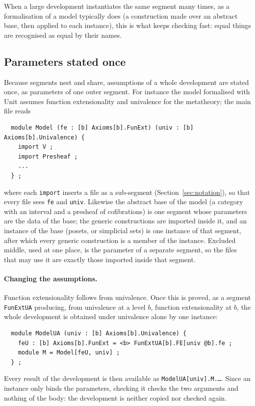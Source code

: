 \documentclass[11pt]{article}
\newcommand{\sys}{\textsf{Unit}\xspace}
\newcommand{\kw}[1]{\texttt{#1}}
\theoremstyle{remark}
\begin{document}
When a large development instantiates
the same segment many times, as a formalisation of a model typically does
(a construction made over an abstract base, then applied to each
instance), this is what keeps checking fast: equal things are recognised
as equal by their names.

\subsection{Parameters stated once}\label{sec:params}

Because segments nest and share, assumptions of a whole development are
stated once, as parameters of one outer segment. For instance the model
formalised with \sys assumes function extensionality and univalence for
the metatheory; the main file reads
\begin{verbatim}
  module Model (fe : [b] Axioms[b].FunExt) (univ : [b] Axioms[b].Univalence) {
    import V ;
    import Presheaf ;
    ...
  } ;
\end{verbatim}
where each \kw{import} inserts a file as a sub-segment
(Section~\ref{sec:notation}), so that every file sees \kw{fe} and \kw{univ}. Likewise the abstract
base of the model (a category with an interval and a presheaf of
cofibrations) is one segment whose parameters are the data of the base;
the generic constructions are imported inside it, and an instance of the
base (posets, or simplicial sets) is one instance of that segment, after
which every generic construction is a member of the instance. Excluded
middle, used at one place, is the parameter of a separate segment, so the
files that may use it are exactly those imported inside that segment.

\paragraph{Changing the assumptions.} Function extensionality follows from
univalence. Once this is proved, as a segment \kw{FunExtUA} producing, from
univalence at a level $b$, function extensionality at $b$, the whole
development is obtained under univalence alone by one instance:
\begin{verbatim}
  module ModelUA (univ : [b] Axioms[b].Univalence) {
    feU : [b] Axioms[b].FunExt = <b> FunExtUA[b].FE[univ @b].fe ;
    module M = Model[feU, univ] ;
  } ;
\end{verbatim}
Every result of the development is then available as
\kw{ModelUA[univ].M.\dots}. Since an instance only binds the parameters,
checking it checks the two arguments and nothing of the body: the
development is neither copied nor checked again.
\end{document}
